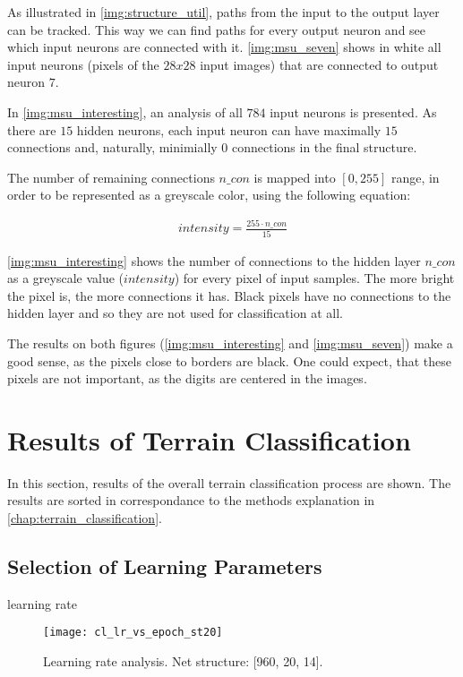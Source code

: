 As illustrated in \cref{img:structure_util}, paths from the input to the output layer can be tracked. This way we can find paths for every output neuron and see which input neurons are connected with it. \cref{img:msu_seven} shows in white all input neurons (pixels of the $ 28x28 $ input images) that are connected to output neuron $ 7 $.

In \cref{img:msu_interesting}, an analysis of all $ 784 $ input neurons is presented. As there are $ 15 $ hidden neurons, each input neuron can have maximally $ 15 $ connections and, naturally, minimially $ 0 $ connections in the final structure. 

The number of remaining connections $ n\_con $ is mapped into $ [0, 255] $ range, in order to be represented as a greyscale color, using the following equation:

\begin{align} \label{eq:grayscale_mapping}
intensity = \frac{255 \cdot n\_con}{15}
\end{align}

\cref{img:msu_interesting} shows the number of connections to the hidden layer $ n\_con $ as a greyscale value ($ intensity $) for every pixel of input samples. The more bright the pixel is, the more connections it has. Black pixels have no connections to the hidden layer and so they are not used for classification at all.

The results on both figures (\ref{img:msu_interesting} and \ref{img:msu_seven}) make a good sense, as the pixels close to borders are black. One could expect, that these pixels are not important, as the digits are centered in the images.

\section{Results of Terrain Classification} \label{sec:terrain_processing_results}
In this section, results of the overall terrain classification process are shown. The results are sorted in correspondance to the methods explanation in \cref{chap:terrain_classification}.

\subsection{Selection of Learning Parameters} \label{ssec:analysis_of_learning_parameters}

learning rate

\begin{figure}[H]
  \centering
  \texttt{[image: cl\_lr\_vs\_epoch\_st20]}
  \caption{Learning rate analysis. Net structure: [960, 20, 14].}
  \label{fig:lr_analysis}
\end{figure}

